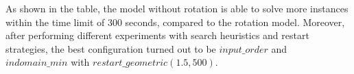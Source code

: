 As shown in the table, the model without rotation is able to solve more instances within the time limit of 300 seconds, compared to the rotation model. Moreover, after performing different experiments with search heuristics and restart strategies, the best configuration turned out to be $input\_order$ and $indomain\_min$ with $restart\_geometric(1.5,500)$.